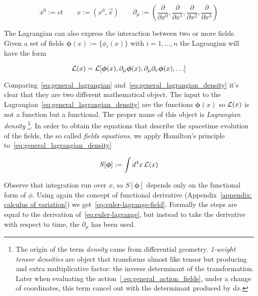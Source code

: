 \begin{equation*}
  x^0 := ct \qquad
  x := (x^0, \vec{x}) \qquad
  \partial_{\mu} := \left(
    \frac{\partial}{\partial x^0},
    \frac{\partial}{\partial x^1},
    \frac{\partial}{\partial x^2},
    \frac{\partial}{\partial x^3}
  \right)
\end{equation*}

The Lagrangian can also express the interaction between two or more fields.
Given a set of fields $\bm{\phi}(x):=\{\phi_i(x)\}$ with $i=1,\ldots,n$ the
Lagrangian will have the form

\begin{equation} \label{eq:general_lagrangian_density}
  \operatorname{\mathcal{L}}(x) = \operatorname{\mathcal{L}}[
      \bm{\phi}(x),
      \partial_{\mu} \bm{\phi}(x),
      \partial_{\mu} \partial_{\nu} \bm{\phi}(x),
      \ldots
    ]
\end{equation}

Comparing~\eqref{eq:general_lagrangian}
and~\eqref{eq:general_lagrangian_density} it's clear that they are two different
mathematical object. The input to the
Lagrangian~\eqref{eq:general_lagrangian_density} are the functions
$\bm{\phi}(x)$ so $\operatorname{\mathcal{L}}(x)$ is not a function but a functional. The proper name
of this object is \emph{Lagrangian density}
\footnote{The origin of the term \emph{density} came from differential geometry.
  \emph{1-weight tensor densities} are object that transforms almost like
  tensor but producing and extra multiplicative factor: the inverse determinant
  of the transformation. Later when evaluating the action~\eqref{
  eq:general_action_fields}, under a change of coordinates, this term
  cancel out with the determinant produced by $dx$.
}.
In order to obtain the equations that describe the spacetime evolution of the
fields, the so called \emph{fields equations}, we apply Hamilton's principle
to~\eqref{eq:general_lagrangian_density}

\begin{equation} \label{eq:general_action_fields}
  S[\bm{\phi}] := \int d^4x \operatorname{\mathcal{L}}(x)
\end{equation}

Observe that integration run over $x$, so $S[\bm{\phi}]$ depends only on the
functional form of $\phi$. Using again the concept of functional derivative
(Appendix~\ref{appendix: calculus of variation}) we
get~\eqref{eq:euler-lagrange-field}. Formally the steps are equal to the
derivation of~\eqref{eq:euler-lagrange}, but instead to take the derivative with
respect to time, the $\partial_{\mu}$ has been used.

